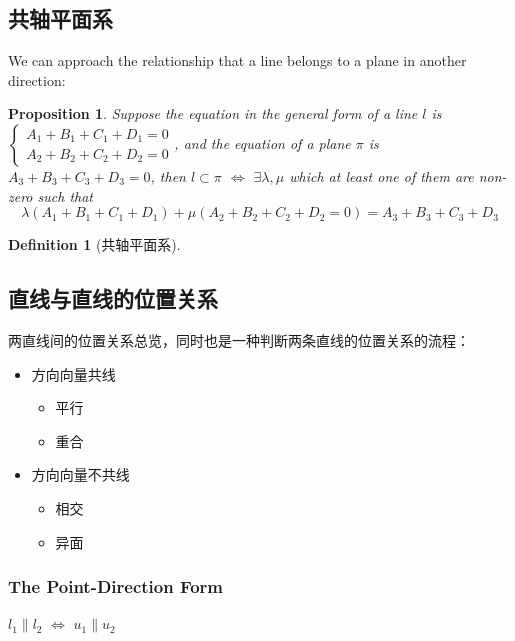 \documentclass[onecolumn]{ctexart}
\newtheorem{definition}{Definition}
\newtheorem{proposition}{Proposition}
\begin{document}
\subsection{共轴平面系}
We can approach the relationship that a line belongs to a plane in another 
direction:
\begin{proposition}
  Suppose the equation in the general form of a line $l$ is $
  \begin{cases}
    A_1 + B_1 + C_1 + D_1 = 0 \\
    A_2 + B_2 + C_2 + D_2 = 0
  \end{cases}$, and the equation of a plane $\pi$ is $A_3 + B_3 + C_3 + D_3 = 0$, 
  then $l \subset \pi$ $\Leftrightarrow$ $\exists \lambda, \mu$ which at least 
  one of them are non-zero such that
  \begin{equation}
    \lambda (A_1 + B_1 + C_1 + D_1) + \mu (A_2 + B_2 + C_2 + D_2 = 0) = A_3 + B_3 + C_3 + D_3
  \end{equation}
\end{proposition}

\begin{definition}[共轴平面系]
  
\end{definition}

\subsection{直线与直线的位置关系}
两直线间的位置关系总览，同时也是一种判断两条直线的位置关系的流程：
\begin{itemize}
  \item 方向向量共线
  \begin{itemize}
    \item 平行
    \item 重合
  \end{itemize}
  \item 方向向量不共线
  \begin{itemize}
    \item 相交
    \item 异面
  \end{itemize}
\end{itemize}

\subsubsection{The Point-Direction Form}

$l_1 \parallel l_2$ $\Leftrightarrow$ $u_1 \parallel u_2$
\end{document}
